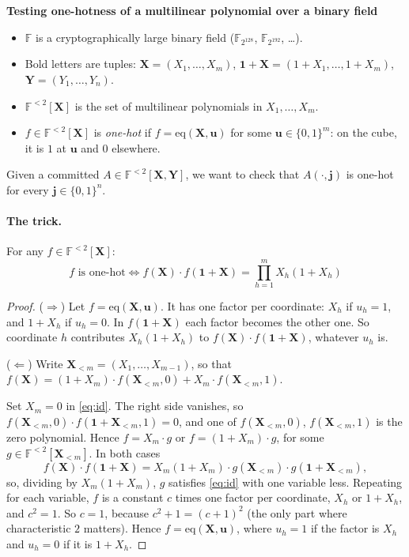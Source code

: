 \documentclass[11pt]{article}
\newcommand{\F}{\mathbb{F}}
\newcommand{\eq}{\mathrm{eq}}
\newcommand{\vj}{\mathbf{j}}
\newcommand{\vu}{\mathbf{u}}
\newcommand{\vx}{\mathbf{X}}
\newcommand{\vone}{\mathbf{1}}
\begin{document}
\begin{center}\Large\textbf{Testing one-hotness of a multilinear polynomial over a binary field}\end{center}
\vspace{0.5em}


\begin{itemize}
\item $\F$ is a cryptographically large binary field ($\F_{2^{128}}$, $\F_{2^{192}}$, \dots).
\item Bold letters are tuples: $\vx = (X_1, \dots, X_m)$, $\vone + \vx = (1 + X_1, \dots, 1 + X_m)$, $\mathbf{Y} = (Y_1, \dots, Y_n)$.
\item $\F^{<2}[\vx]$ is the set of multilinear polynomials in $X_1, \dots, X_m$.
\item $f \in \F^{<2}[\vx]$ is \emph{one-hot} if $f = \eq(\vx, \vu)$ for some $\vu \in \{0,1\}^m$: on the cube, it is $1$ at $\vu$ and $0$ elsewhere.
\end{itemize}

Given a committed $A \in \F^{<2}[\vx, \mathbf{Y}]$, we want to check that $A(\cdot, \vj)$ is one-hot for every $\vj \in \{0,1\}^n$.

\paragraph{The trick.} For any $f \in \F^{<2}[\vx]$:
\begin{equation}\label{eq:id}
\boxed{\; f \text{ is one-hot} \iff f(\vx) \cdot f(\vone + \vx) = \prod_{h=1}^m X_h(1 + X_h) \;}
\end{equation}

\begin{proof}
($\Rightarrow$) Let $f = \eq(\vx, \vu)$. It has one factor per coordinate: $X_h$ if $u_h = 1$, and $1 + X_h$ if $u_h = 0$. In $f(\vone + \vx)$ each factor becomes the other one. So coordinate $h$ contributes $X_h(1 + X_h)$ to $f(\vx) \cdot f(\vone + \vx)$, whatever $u_h$ is.

($\Leftarrow$) Write $\vx_{<m} = (X_1, \dots, X_{m-1})$, so that $f(\vx) = (1 + X_m) \cdot f(\vx_{<m}, 0) + X_m \cdot f(\vx_{<m}, 1)$.

Set $X_m = 0$ in \eqref{eq:id}. The right side vanishes, so $f(\vx_{<m}, 0) \cdot f(\vone + \vx_{<m}, 1) = 0$, and one of $f(\vx_{<m}, 0)$, $f(\vx_{<m}, 1)$ is the zero polynomial. Hence $f = X_m \cdot g$ or $f = (1 + X_m) \cdot g$, for some $g \in \F^{<2}[\vx_{<m}]$. In both cases
\[
f(\vx) \cdot f(\vone + \vx) = X_m (1 + X_m) \cdot g(\vx_{<m}) \cdot g(\vone + \vx_{<m}) ,
\]
so, dividing by $X_m(1 + X_m)$, $g$ satisfies \eqref{eq:id} with one variable less. Repeating for each variable, $f$ is a constant $c$ times one factor per coordinate, $X_h$ or $1 + X_h$, and $c^2 = 1$. So $c = 1$, because $c^2 + 1 = (c + 1)^2$ (the only part where characteristic $2$ matters). Hence $f = \eq(\vx, \vu)$, where $u_h = 1$ if the factor is $X_h$ and $u_h = 0$ if it is $1 + X_h$.
\end{proof}
\end{document}

